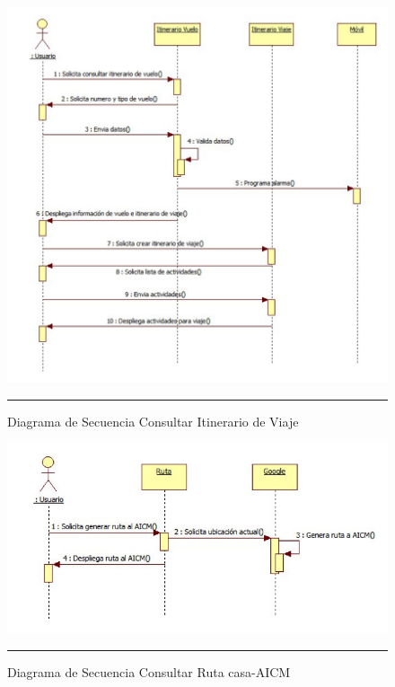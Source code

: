 \begin{figure}[H]
	\centering
		\includegraphics[width=1\textwidth]{Figuras/secConsultarItinerarioViaje.png}
		\rule{30em}{0.5pt}
	\caption[Diagrama de Secuencia Consultar Itinerario de Viaje]{Diagrama de Secuencia Consultar Itinerario de Viaje}
	\label{fig:secConsultarItinerarioViaje}
\end{figure}

\begin{figure}[H]
	\centering
		\includegraphics[width=1\textwidth]{Figuras/secConsultarRutacasa-AICM.png}
		\rule{30em}{0.5pt}
	\caption[Diagrama de Secuencia Consultar Ruta casa-AICM]{Diagrama de Secuencia Consultar Ruta casa-AICM}
	\label{fig:secConsultarRutacasa-AICM}
\end{figure}

